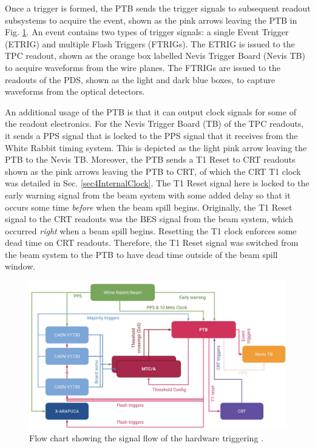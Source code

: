 Once a trigger is formed, the PTB sends the trigger signals to subsequent readout subsystems to acquire the event, shown as the pink arrows leaving the PTB in Fig. \ref{fig:SBND_Trigger}.
An event contains two types of trigger signals: a single Event Trigger (ETRIG) and multiple Flash Triggers (FTRIGs).
The ETRIG is issued to the TPC readout, shown as the orange box labelled Nevis Trigger Board (Nevis TB) to acquire waveforms from the wire planes.
The FTRIGs are issued to the readouts of the PDS, shown as the light and dark blue boxes, to capture waveforms from the optical detectors.

An additional usage of the PTB is that it can output clock signals for some of the readout electronics.
For the Nevis Trigger Board (TB) of the TPC readouts, it sends a PPS signal that is locked to the PPS signal that it receives from the White Rabbit timing system.
This is depicted as the light pink arrow leaving the PTB to the Nevis TB.
Moreover, the PTB sends a T1 Reset to CRT readouts shown as the pink arrows leaving the PTB to CRT, of which the CRT T1 clock was detailed in Sec. \ref{sec4InternalClock}.
The T1 Reset signal here is locked to the early warning signal from the beam system with some added delay so that it occurs some time \textit{before} when the beam spill begins.
Originally, the T1 Reset signal to the CRT readouts was the BES signal from the beam system, which occurred \textit{right} when a beam spill begins.
Resetting the T1 clock enforces some dead time on CRT readouts.
Therefore, the T1 Reset signal was switched from the beam system to the PTB to have dead time outside of the beam spill window.  

\begin{figure}[hb!] 
\centering    
\includegraphics[width=1.0\textwidth]{SBND_Trigger}
\caption[Hardware Triggering Flow Chart]{
Flow chart showing the signal flow of the hardware triggering \cite{ptb_gvs}.
}
\label{fig:SBND_Trigger}
\end{figure}
